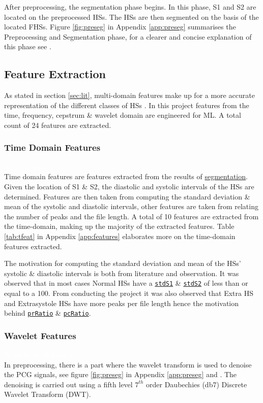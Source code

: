 \documentclass[10pt,twocolumn]{witseiepaper}
\begin{document}
After preprocessing, the segmentation phase begins. In this phase, S1 and S2 are located on the preprocessed HSs. The HSs are then segmented on the basis of the located FHSs. Figure \ref{fig:preseg} in Appendix \ref{app:preseg} summarises the Preprocessing and Segmentation phase, for a clearer and concise explanation of this phase see \cite{love}.

\subsection{Feature Extraction}
As stated in section \ref{sec:lit}, multi-domain features make up for a more accurate representation of the different classes of HSs \cite{22,44}. In this project features from the time, frequency, cepstrum \& wavelet domain are engineered for ML. A total count of 24 features are extracted.

\subsubsection{Time Domain Features}
\textcolor{white}{Ke na le modisa...}\\
Time domain features are features extracted from the results of \hyperref[sec:preseg]{segmentation}. Given the location of S1 \& S2, the diastolic and systolic intervals of the HSs are determined. Features are then taken from computing the standard deviation \& mean of the systolic and diastolic intervals, other features are taken from relating the number of peaks and the file length. A total of 10 features are extracted from the time-domain, making up the majority of the extracted features. Table \ref{tab:tfeat} in Appendix \ref{app:features} elaborates more on the time-domain features extracted.

The motivation for computing the standard deviation and mean of the HSs' systolic \& diastolic intervals is both from literature \cite{gomes2012classifying,bentley} and observation. It was observed that in most cases Normal HSs have a \hyperref[t:s1]{\texttt{stdS1}} \& \hyperref[t:s2]{\texttt{stdS2}} of less than or equal to a 100. From conducting the project it was also observed that Extra HS and Extrasystole HSs have more peaks per file length hence the motivation behind \hyperref[t:pr]{\texttt{prRatio}} \& \hyperref[t:pc]{\texttt{pcRatio}}.

\subsubsection{Wavelet Features}
\textcolor{white}{Ke tlabe ke hlokang...}\\
In preprocessing, there is a part where the wavelet transform is used to denoise the PCG signals, see figure \ref{fig:preseg} in Appendix \ref{app:preseg} and \cite{love}. The denoising is carried out using a fifth level $7^{th}$ order Daubechies (db7) Discrete Wavelet Transform (DWT). 
\end{document}
